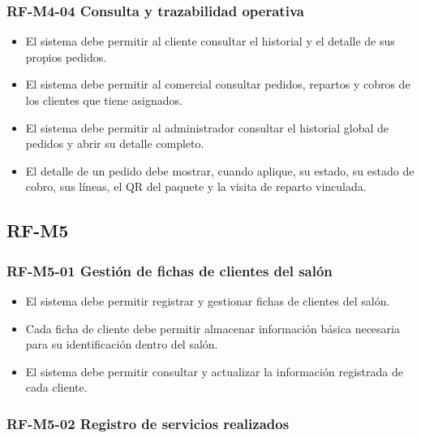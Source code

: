\subsubsection{RF-M4-04 Consulta y trazabilidad operativa}
\vspace{-1em}

\begin{itemize}
    \item El sistema debe permitir al cliente consultar el historial y el detalle de sus propios pedidos.
    \item El sistema debe permitir al comercial consultar pedidos, repartos y cobros de los clientes que tiene asignados.
    \item El sistema debe permitir al administrador consultar el historial global de pedidos y abrir su detalle completo.
    \item El detalle de un pedido debe mostrar, cuando aplique, su estado, su estado de cobro, sus líneas, el QR del paquete y la visita de reparto vinculada.
\end{itemize}
\subsection{RF-M5}

\vspace{-0.75em}
\subsubsection{RF-M5-01 Gestión de fichas de clientes del salón}
\vspace{-1em}

\begin{itemize}
    \item El sistema debe permitir registrar y gestionar fichas de clientes del salón.
    \item Cada ficha de cliente debe permitir almacenar información básica necesaria para su identificación dentro del salón.
    \item El sistema debe permitir consultar y actualizar la información registrada de cada cliente.
\end{itemize}

\vspace{-0.75em}
\subsubsection{RF-M5-02 Registro de servicios realizados}
\vspace{-1em}

